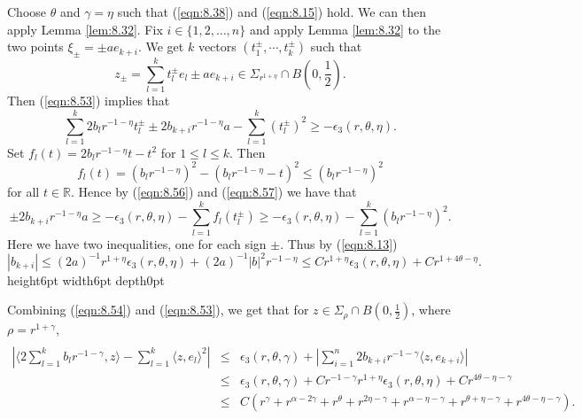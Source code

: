 \documentclass[12pt,leqno]{article}
\newcommand\qed{\hfill\vrule height6pt width6pt depth0pt}
\newcommand{\RR}{\mathbb{R}}
\theoremstyle{plain}
\newenvironment{proof}{\medskip\noindent{\bf Proof: }\rmfamily}{\medskip}
\numberwithin{equation}{section}
\begin{document}
\begin{proof}
Choose $\theta$ and $\gamma=\eta$ such that (\ref{eqn:8.38})
and (\ref{eqn:8.15})
hold. We can then apply Lemma
\ref{lem:8.32}. Fix $i\in\{1, 2, \ldots, n\}$ and apply Lemma \ref{lem:8.32}
to the two points $\xi_\pm=\pm ae_{k+i}$. We get $k$ vectors
$(t_1^\pm, \cdots, t_k^\pm)$ such that
\begin{equation}\label{eqn:8.55}
z_\pm = \sum_{l=1}^k t_l^\pm e_l \pm ae_{k+i} \in
\Sigma_{r^{1+\eta}}\cap B(0, \frac{1}{2}).
\end{equation}
Then (\ref{eqn:8.53})
implies that
\begin{equation}\label{eqn:8.56}
\sum_{l=1}^k 2b_lr^{-1-\eta}t_l^\pm \pm 2b_{k+i}r^{-1-\eta} a-
\sum_{l=1}^k(t_l^\pm)^2 \ge
-\epsilon_3(r,\theta,\eta).
\end{equation}
Set $f_l(t)=2b_lr^{-1-\eta}t-t^2$ for $1\le l\le k$. Then
\begin{equation}\label{eqn:8.57}
f_l(t) = (b_lr^{-1-\eta})^2 - (b_lr^{-1-\eta}-t)^2 \le
(b_lr^{-1-\eta})^2
\end{equation}
for all $t\in\RR$. Hence by (\ref{eqn:8.56}) and (\ref{eqn:8.57}) we have
that
\begin{equation}\label{eqn:8.58}
\pm 2b_{k+i}r^{-1-\eta} a \ge -\epsilon_3(r,\theta,\eta)-
\sum_{l=1}^kf_l(t_l^\pm) \ge
-\epsilon_3(r,\theta,\eta) - \sum_{l=1}^k(b_lr^{-1-\eta})^2.
\end{equation}
Here we have two inequalities, one for each sign $\pm$. Thus by
(\ref{eqn:8.13})
\begin{equation}\label{eqn:8.59}
|b_{k+i}| \le (2a)^{-1}r^{1+\eta}\epsilon_3(r,\theta,\eta) +
(2a)^{-1}|b|^2r^{-1-\eta} \le Cr^{1+\eta}\epsilon_3(r,\theta,\eta) +
Cr^{1+4\theta-\eta}.
\end{equation} \qed
\end{proof}
\medskip


Combining (\ref{eqn:8.54}) and (\ref{eqn:8.53}), we get that for
$z\in\Sigma_\rho\cap B(0, \frac{1}{2})$, where $\rho=r^{1+\gamma}$,
\begin{eqnarray}\label{eqn:8.60}
& & \\
|\langle 2\sum_{l=1}^k b_lr^{-1-\gamma}, z\rangle-
\sum_{l=1}^k\langle z,e_l\rangle^2|
& \leq & \epsilon_3(r,\theta,\gamma) +|\sum_{i=1}^n 2b_{k+i}r^{-1-\gamma}\langle
z, e_{k+i}\rangle|\nonumber\\
&\le &  \epsilon_3(r,\theta,\gamma) +Cr^{-1-\gamma}
r^{1+\eta}\epsilon_3(r,\theta,\eta) +
Cr^{4\theta-\eta-\gamma}\nonumber\\
&\le& C(r^{\gamma}+r^{\alpha-2\gamma}+r^\theta +r^{2\eta-\gamma}+
r^{\alpha-\eta-\gamma} + r^{\theta+\eta-\gamma} + r^{4\theta-\eta-\gamma}).
\nonumber
\end{eqnarray}
\end{document}
